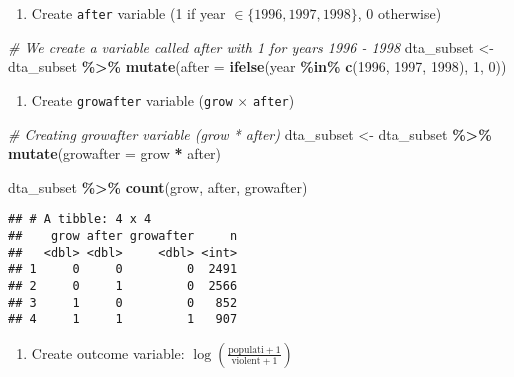 \documentclass[
]{article}
\newenvironment{Shaded}{\begin{snugshade}}{\end{snugshade}}
\newcommand{\AttributeTok}[1]{\textcolor[rgb]{0.13,0.29,0.53}{#1}}
\newcommand{\CommentTok}[1]{\textcolor[rgb]{0.56,0.35,0.01}{\textit{#1}}}
\newcommand{\DecValTok}[1]{\textcolor[rgb]{0.00,0.00,0.81}{#1}}
\newcommand{\FunctionTok}[1]{\textcolor[rgb]{0.13,0.29,0.53}{\textbf{#1}}}
\newcommand{\NormalTok}[1]{#1}
\newcommand{\OtherTok}[1]{\textcolor[rgb]{0.56,0.35,0.01}{#1}}
\newcommand{\SpecialCharTok}[1]{\textcolor[rgb]{0.81,0.36,0.00}{\textbf{#1}}}
\providecommand{\tightlist}{%
  \setlength{\itemsep}{0pt}\setlength{\parskip}{0pt}}
\begin{document}
\begin{enumerate}
\def\labelenumi{\arabic{enumi}.}
\setcounter{enumi}{2}
\tightlist
\item
  Create \texttt{after} variable (1 if year
  \(\in \{1996, 1997, 1998\}\), 0 otherwise)
\end{enumerate}

\begin{Shaded}
\begin{Highlighting}[]
\CommentTok{\# We create a variable called after with 1 for years 1996 {-} 1998}
\NormalTok{dta\_subset }\OtherTok{\textless{}{-}}\NormalTok{ dta\_subset }\SpecialCharTok{\%\textgreater{}\%} 
  \FunctionTok{mutate}\NormalTok{(}\AttributeTok{after =} \FunctionTok{ifelse}\NormalTok{(year }\SpecialCharTok{\%in\%} \FunctionTok{c}\NormalTok{(}\DecValTok{1996}\NormalTok{, }\DecValTok{1997}\NormalTok{, }\DecValTok{1998}\NormalTok{), }\DecValTok{1}\NormalTok{, }\DecValTok{0}\NormalTok{))}
\end{Highlighting}
\end{Shaded}

\begin{enumerate}
\def\labelenumi{\arabic{enumi}.}
\setcounter{enumi}{3}
\tightlist
\item
  Create \texttt{growafter} variable (\texttt{grow} \(\times\)
  \texttt{after})
\end{enumerate}

\begin{Shaded}
\begin{Highlighting}[]
\CommentTok{\# Creating growafter variable (grow * after)}
\NormalTok{dta\_subset }\OtherTok{\textless{}{-}}\NormalTok{ dta\_subset }\SpecialCharTok{\%\textgreater{}\%} 
  \FunctionTok{mutate}\NormalTok{(}\AttributeTok{growafter =}\NormalTok{ grow }\SpecialCharTok{*}\NormalTok{ after)}

\NormalTok{dta\_subset }\SpecialCharTok{\%\textgreater{}\%} 
  \FunctionTok{count}\NormalTok{(grow, after, growafter)}
\end{Highlighting}
\end{Shaded}

\begin{verbatim}
## # A tibble: 4 x 4
##    grow after growafter     n
##   <dbl> <dbl>     <dbl> <int>
## 1     0     0         0  2491
## 2     0     1         0  2566
## 3     1     0         0   852
## 4     1     1         1   907
\end{verbatim}

\begin{enumerate}
\def\labelenumi{\arabic{enumi}.}
\setcounter{enumi}{4}
\tightlist
\item
  Create outcome variable:
  \(\log\left(\frac{\text{populati}+1}{\text{violent}+1}\right)\)
\end{enumerate}
\end{document}
